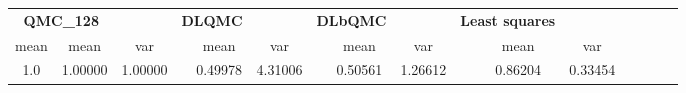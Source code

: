 \begin{tabular}{cccccccccccccccc}
\toprule
\multicolumn{2}{c}{\textbf{QMC\_128}}&&\multicolumn{2}{c}{\textbf{DLQMC}}&&\multicolumn{2}{c}{\textbf{DLbQMC}}&&\multicolumn{2}{c}{\textbf{Least squares}}\\ 
\cmidrule(r){2-3} \cmidrule(r){5-6} \cmidrule(r){8-9}
mean &mean&var&&mean&var&&mean&var&&mean&var\\ 
\midrule
1.0 &1.00000&1.00000&&0.49978&4.31006&&0.50561&1.26612&&0.86204&0.33454\\ 
\bottomrule
\end{tabular}

